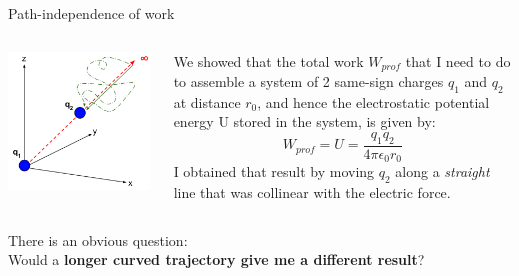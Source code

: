 %
%
%

\begin{frame}{Path-independence of work}

\begin{columns}
  \begin{column}{0.50\textwidth}
   \begin{center}
     \includegraphics[width=0.99\textwidth]{./images/schematics/work_2_like_charges_2_q1q2_curved.png}\\
   \end{center}
  \end{column}
  \begin{column}{0.50\textwidth}
    We showed that the total work $W_{prof}$ that I need to do to assemble a system of 2 same-sign
    charges $q_1$ and $q_2$ at distance $r_0$, and hence the electrostatic potential energy U stored in the system,
    is given by:
    \begin{equation*}
      W_{prof} = U = \frac{q_1 q_2}{4\pi\epsilon_0 r_0}
    \end{equation*}
    I obtained that result by moving $q_2$ along a {\em straight} line that
    was collinear with the electric force.\\
  \end{column}
\end{columns}

\vspace{0.2cm}
There is an obvious question:\\
Would a {\bf longer curved trajectory give me a different result}?

\end{frame}

